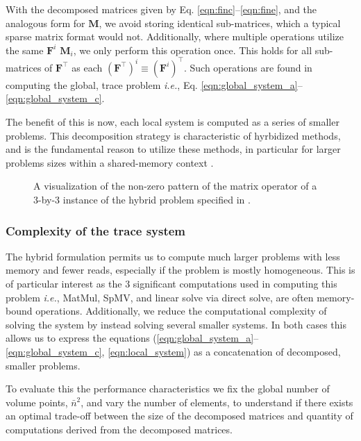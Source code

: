 %
%
%
\noindent
With the decomposed matrices given by Eq. \ref{eqn:finc}--\ref{eqn:fine}, and the analogous form for $\textbf{M}$, we avoid storing identical sub-matrices, which a typical sparse matrix format would not. 
Additionally, where multiple operations utilize the same $\textbf{F}^i$ $\textbf{M}_i$, we only perform this operation once. 
This holds for all sub-matrices of $\textbf{F}^\intercal$ as each $(\textbf{F}^\intercal)^i \equiv (\textbf{F}^i)^\intercal$.
Such operations are found in computing the global, trace problem \emph{i.e.}, Eq. \ref{eqn:global_system_a}--\ref{eqn:global_system_c}.

The benefit of this is now, each local system is computed as a series of smaller problems. 
This decomposition strategy is characteristic of hyrbidized methods, and is the fundamental reason to utilize these methods, in particular for larger problems sizes within a shared-memory context \citep{kozdon2021hybridized, kolev2021efficient, fernandez2017hybridized}. 

\begin{figure}
	\centering
	
	\caption{A visualization of the non-zero pattern of the matrix operator of a 3-by-3 instance of the hybrid problem specified 
	in .}
	\label{fig:block_diagram}
\end{figure}

%
%
%
\subsubsection{Complexity of the trace system} 

The hybrid formulation permits us to compute much larger problems with less memory and fewer reads, especially if the problem is mostly homogeneous.
This is of particular interest as the 3 significant computations used in computing this problem \emph{i.e.}, MatMul, SpMV, and linear solve via direct solve, are often memory-bound operations. 
Additionally, we reduce the computational complexity of solving the system by instead solving several smaller systems. 
In both cases this allows us to express 
the equations (\ref{eqn:global_system_a}--\ref{eqn:global_system_c}, 
\ref{eqn:local_system}) as a concatenation of decomposed, smaller problems.

To evaluate this the performance characteristics we fix the global number of volume points, $\bar{n}^2$, and vary the number of elements, to understand if there exists an optimal trade-off between the size of the decomposed matrices and quantity of computations derived from the decomposed matrices.


